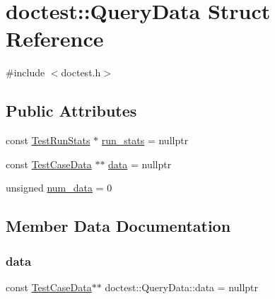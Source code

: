 \hypertarget{structdoctest_1_1_query_data}{}\section{doctest\+:\+:Query\+Data Struct Reference}
\label{structdoctest_1_1_query_data}


{\ttfamily \#include $<$doctest.\+h$>$}

\subsection*{Public Attributes}
\begin{DoxyCompactItemize}
\item 
const \mbox{\hyperlink{structdoctest_1_1_test_run_stats}{Test\+Run\+Stats}} $\ast$ \mbox{\hyperlink{structdoctest_1_1_query_data_a435f443f389323f47cb8b0e4202bbea9}{run\+\_\+stats}} = nullptr
\item 
const \mbox{\hyperlink{structdoctest_1_1_test_case_data}{Test\+Case\+Data}} $\ast$$\ast$ \mbox{\hyperlink{structdoctest_1_1_query_data_a8085a29db9a1cd5c7eff22ef44e9a9e8}{data}} = nullptr
\item 
unsigned \mbox{\hyperlink{structdoctest_1_1_query_data_af1033338fe975ae3c19b16452401230d}{num\+\_\+data}} = 0
\end{DoxyCompactItemize}


\subsection{Member Data Documentation}
\mbox{\label{structdoctest_1_1_query_data_a8085a29db9a1cd5c7eff22ef44e9a9e8}} 
\subsubsection{\texorpdfstring{data}{data}}
{\footnotesize\ttfamily const \mbox{\hyperlink{structdoctest_1_1_test_case_data}{Test\+Case\+Data}}$\ast$$\ast$ doctest\+::\+Query\+Data\+::data = nullptr}

\mbox{\label{structdoctest_1_1_query_data_af1033338fe975ae3c19b16452401230d}} 
